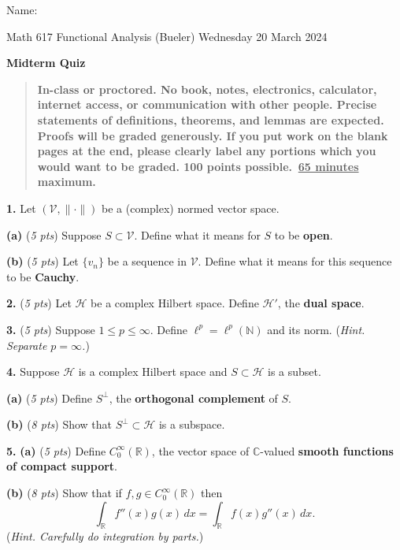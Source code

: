 \documentclass[12pt]{amsart}
\newcommand{\cH}{\mathcal{H}}
\newcommand{\cV}{\mathcal{V}}
\newcommand{\CC}{{\mathbb{C}}}
\newcommand{\RR}{{\mathbb{R}}}
\newcommand{\NN}{{\mathbb{N}}}
\newcommand{\prob}[1]{\bigskip\noindent\textbf{#1.} }
\newcommand{\pts}[1]{(\emph{#1 pts})}
\newcommand{\probpts}[2]{\prob{#1} \pts{#2} \quad}
\newcommand{\ppartpts}[2]{\textbf{(#1)} \pts{#2} \quad}
\newcommand{\epartpts}[2]{\medskip\noindent \textbf{(#1)} \pts{#2} \quad}
\begin{document}
\hfill \Large Name:\underline{\phantom{Ed Bueler really really long long long name}}
\medskip

\scriptsize \noindent Math 617 Functional Analysis (Bueler) \hfill Wednesday 20 March 2024
\medskip

\LARGE\centerline{\textbf{Midterm Quiz}}

\normalsize
\smallskip
\begin{quote}
\textbf{In-class or proctored.  No book, notes, electronics, calculator, internet access, or communication with other people.  Precise statements of definitions, theorems, and lemmas are expected.  Proofs will be graded generously.  If you put work on the blank pages at the end, please clearly label any portions which you would want to be graded.  100 points possible. \,\underline{65 minutes} maximum.}
\end{quote}

\normalsize
\medskip

\thispagestyle{empty}

\prob{1}  Let $(\cV,\|\cdot\|)$ be a (complex) normed vector space.

\epartpts{a}{5}  Suppose $S \subset \cV$.  Define what it means for $S$ to be \textbf{open}.
\vfill

\epartpts{b}{5}  Let $\{v_n\}$ be a sequence in $\cV$.  Define what it means for this sequence to be \textbf{Cauchy}.
\vfill

\probpts{2}{5}  Let $\cH$ be a complex Hilbert space.  Define $\cH'$, the \textbf{dual space}.
\vfill


\clearpage\newpage
\probpts{3}{5}  Suppose $1\le p\le \infty$.  Define $\ell^p=\ell^p(\NN)$ and its norm.  (\emph{Hint. Separate $p=\infty$.})
\vfill

\prob{4}  Suppose $\cH$ is a complex Hilbert space and $S\subset \cH$ is a subset.

\epartpts{a}{5}  Define $S^\perp$, the \textbf{orthogonal complement} of $S$.
\vspace{1.5in}

\epartpts{b}{8}  Show that $S^\perp\subset \cH$ is a subspace.
\vfill


\clearpage\newpage
\prob{5}  \ppartpts{a}{5}  Define $C_0^\infty(\RR)$, the vector space of $\CC$-valued \textbf{smooth functions of compact support}.
\vspace{3.0in}

\epartpts{b}{8}  Show that if $f,g \in C_0^\infty(\RR)$ then
	$$\int_\RR f''(x) g(x) \,dx = \int_\RR f(x) g''(x) \,dx.$$
(\emph{Hint. Carefully do integration by parts.})
\vfill
\end{document}
